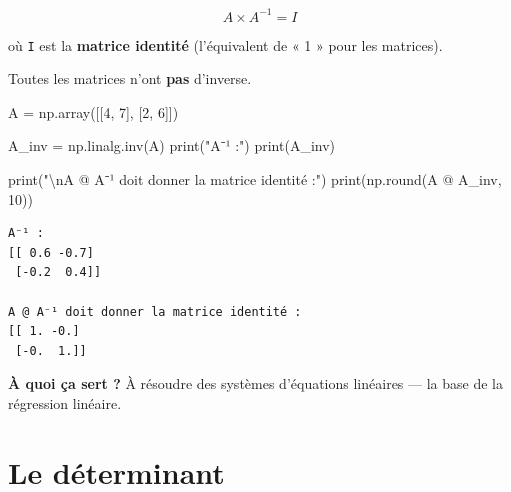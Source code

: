 \documentclass[
  french,
  11pt,
  a4paper,
]{scrbook}
\newenvironment{Shaded}{}{}
\newcommand{\BuiltInTok}[1]{\textcolor[rgb]{0.84,0.23,0.29}{#1}}
\newcommand{\CharTok}[1]{\textcolor[rgb]{0.01,0.18,0.38}{#1}}
\newcommand{\DecValTok}[1]{\textcolor[rgb]{0.00,0.36,0.77}{#1}}
\newcommand{\NormalTok}[1]{\textcolor[rgb]{0.14,0.16,0.18}{#1}}
\newcommand{\OperatorTok}[1]{\textcolor[rgb]{0.14,0.16,0.18}{#1}}
\newcommand{\StringTok}[1]{\textcolor[rgb]{0.01,0.18,0.38}{#1}}
\begin{document}
\[A \times A^{-1} = I\]

où \texttt{I} est la \textbf{matrice identité} (l'équivalent de « 1 »
pour les matrices).

\begin{tcolorbox}[enhanced jigsaw, arc=.35mm, bottomrule=.15mm, bottomtitle=1mm, breakable, colback=white, colbacktitle=quarto-callout-warning-color!10!white, colframe=quarto-callout-warning-color-frame, coltitle=black, left=2mm, leftrule=.75mm, opacityback=0, opacitybacktitle=0.6, rightrule=.15mm, title=\textcolor{quarto-callout-warning-color}{\faExclamationTriangle}\hspace{0.5em}{Avertissement}, titlerule=0mm, toprule=.15mm, toptitle=1mm]

Toutes les matrices n'ont \textbf{pas} d'inverse.

\end{tcolorbox}

\begin{Shaded}
\begin{Highlighting}[]
\NormalTok{A }\OperatorTok{=}\NormalTok{ np.array([[}\DecValTok{4}\NormalTok{, }\DecValTok{7}\NormalTok{], [}\DecValTok{2}\NormalTok{, }\DecValTok{6}\NormalTok{]])}

\NormalTok{A\_inv }\OperatorTok{=}\NormalTok{ np.linalg.inv(A)}
\BuiltInTok{print}\NormalTok{(}\StringTok{"A⁻¹ :"}\NormalTok{)}
\BuiltInTok{print}\NormalTok{(A\_inv)}

\BuiltInTok{print}\NormalTok{(}\StringTok{"}\CharTok{\textbackslash{}n}\StringTok{A @ A⁻¹ doit donner la matrice identité :"}\NormalTok{)}
\BuiltInTok{print}\NormalTok{(np.}\BuiltInTok{round}\NormalTok{(A }\OperatorTok{@}\NormalTok{ A\_inv, }\DecValTok{10}\NormalTok{))}
\end{Highlighting}
\end{Shaded}

\begin{verbatim}
A⁻¹ :
[[ 0.6 -0.7]
 [-0.2  0.4]]

A @ A⁻¹ doit donner la matrice identité :
[[ 1. -0.]
 [-0.  1.]]
\end{verbatim}

\textbf{À quoi ça sert ?} À résoudre des systèmes d'équations linéaires
--- la base de la régression linéaire.

\section{Le déterminant}\label{le-duxe9terminant}
\end{document}
